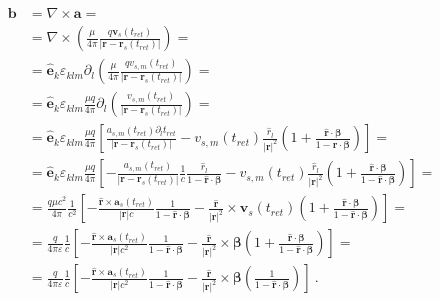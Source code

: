 \documentclass[letterpaper,10pt,english]{jupyterBook}
\begin{document}
\begin{equation*}
\begin{split}\begin{aligned}
  \mathbf{b} 
  & = \nabla \times \mathbf{a} = \\
  & = \nabla \times \left( \frac{\mu}{4 \pi} \frac{q \mathbf{v}_s(t_{ret})}{|\mathbf{r} - \mathbf{r}_s(t_{ret})|} \right) = \\
  & = \hat{\mathbf{e}}_k \varepsilon_{klm} \partial_l \left( \frac{\mu}{4 \pi} \frac{q v_{s,m}(t_{ret})}{|\mathbf{r} - \mathbf{r}_s(t_{ret})|} \right) = \\
  & = \hat{\mathbf{e}}_k \varepsilon_{klm} \frac{\mu q}{4 \pi} \partial_l \left( \frac{v_{s,m}(t_{ret})}{|\mathbf{r} - \mathbf{r}_s(t_{ret})|} \right) = \\
  & = \hat{\mathbf{e}}_k \varepsilon_{klm} \frac{\mu q}{4 \pi} \left[ \frac{a_{s,m}(t_{ret}) \partial_l t_{ret}}{|\mathbf{r}-\mathbf{r}_s(t_{ret})|} - v_{s,m}(t_{ret})\frac{\hat{r}_l}{|\mathbf{r}|^2} \left( 1 + \frac{\hat{\mathbf{r}} \cdot \boldsymbol\beta}{1 - \hat{\mathbf{r}} \cdot \boldsymbol\beta} \right) \right] = \\
  & = \hat{\mathbf{e}}_k \varepsilon_{klm} \frac{\mu q}{4 \pi} \left[ - \frac{a_{s,m}(t_{ret}) }{|\mathbf{r}-\mathbf{r}_s(t_{ret})|} \frac{1}{c} \frac{\hat{r}_l}{1 - \hat{\mathbf{r}} \cdot \boldsymbol\beta} - v_{s,m}(t_{ret})\frac{\hat{r}_l}{|\mathbf{r}|^2} \left( 1 + \frac{\hat{\mathbf{r}} \cdot \boldsymbol\beta}{1 - \hat{\mathbf{r}} \cdot \boldsymbol\beta} \right) \right] = \\
  & = \frac{q \mu c^2}{4 \pi} \frac{1}{c^2} \left[ -\frac{\hat{\mathbf{r}} \times \mathbf{a}_s(t_{ret})}{|\mathbf{r}| c} \frac{1}{1-\hat{\mathbf{r}} \cdot \boldsymbol\beta} - \frac{\hat{\mathbf{r}}}{|\mathbf{r}|^2} \times \mathbf{v}_s(t_{ret}) \left( 1 + \frac{\hat{\mathbf{r}} \cdot \boldsymbol\beta}{1 - \hat{\mathbf{r}} \cdot \boldsymbol\beta} \right) \right] = \\
  & = \frac{q}{4 \pi \varepsilon} \frac{1}{c} \left[ -\frac{\hat{\mathbf{r}} \times \mathbf{a}_s(t_{ret})}{|\mathbf{r}| c^2} \frac{1}{1-\hat{\mathbf{r}} \cdot \boldsymbol\beta} - \frac{\hat{\mathbf{r}}}{|\mathbf{r}|^2} \times \boldsymbol\beta \left( 1 + \frac{\hat{\mathbf{r}} \cdot \boldsymbol\beta}{1 - \hat{\mathbf{r}} \cdot \boldsymbol\beta} \right)  \right] = \\
  & = \frac{q}{4 \pi \varepsilon} \frac{1}{c} \left[ -\frac{\hat{\mathbf{r}} \times \mathbf{a}_s(t_{ret})}{|\mathbf{r}| c^2} \frac{1}{1-\hat{\mathbf{r}} \cdot \boldsymbol\beta} - \frac{\hat{\mathbf{r}}}{|\mathbf{r}|^2} \times \boldsymbol\beta \left( \frac{1}{1 - \hat{\mathbf{r}} \cdot \boldsymbol\beta} \right)  \right] \ .
\end{aligned}\end{split}
\end{equation*}
\end{document}
